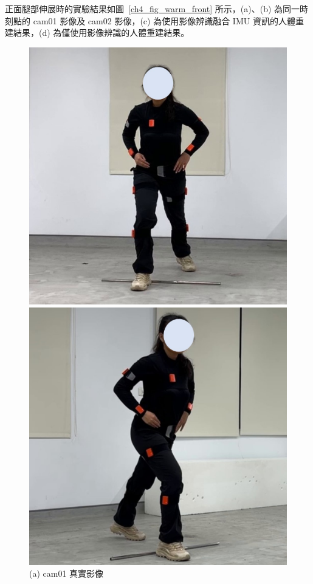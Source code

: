 \clearpage

正面腿部伸展時的實驗結果如圖~\ref{ch4_fig_warm_front} 所示，(a)、(b) 為同一時刻點的 cam01 影像及 cam02 影像，(c) 為使用影像辨識融合 IMU 資訊的人體重建結果，(d) 為僅使用影像辨識的人體重建結果。

\begin{figure}[!ht]
   \centering
   \begin{minipage}{.5\textwidth}
      \centering
      \includegraphics[width=.95\linewidth]{figure/ch4_fig_warm_cam01_with3.jpg}
      \caption*{(a) cam01 真實影像}
    \end{minipage}%
    \begin{minipage}{.5\textwidth}
       \centering
       \includegraphics[width=.95\linewidth]{figure/ch4_fig_warm_cam02_with3.jpg}

\end{minipage}
\end{figure}
